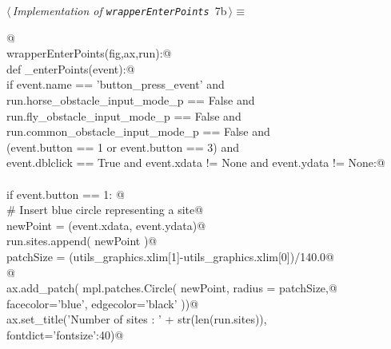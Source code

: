 \documentclass[11.5pt]{report}
\begin{document}
\begin{flushleft} \small\label{scrap7}\raggedright\small
{} $\langle\,${\itshape Implementation of \verb|wrapperEnterPoints|}\nobreak\ {\footnotesize {7b}}$\,\rangle\equiv$
\vspace{-1ex}
\begin{list}{}{} \item
\mbox{}\verb@   @\\
\mbox{}\verb@def wrapperEnterPoints(fig,ax,run):@\\
\mbox{}\verb@    def _enterPoints(event):@\\
\mbox{}\verb@        if event.name      == 'button_press_event'          and \@\\
\mbox{}\verb@           run.horse_obstacle_input_mode_p  == False        and \@\\
\mbox{}\verb@           run.fly_obstacle_input_mode_p    == False        and \@\\
\mbox{}\verb@           run.common_obstacle_input_mode_p == False        and \@\\
\mbox{}\verb@           (event.button   == 1 or event.button == 3)       and \@\\
\mbox{}\verb@            event.dblclick == True and event.xdata  != None and event.ydata  != None:@\\
\mbox{}\verb@@\\
\mbox{}\verb@             if event.button == 1:  @\\
\mbox{}\verb@                 # Insert blue circle representing a site@\\
\mbox{}\verb@                 newPoint = (event.xdata, event.ydata)@\\
\mbox{}\verb@                 run.sites.append( newPoint  )@\\
\mbox{}\verb@                 patchSize  = (utils_graphics.xlim[1]-utils_graphics.xlim[0])/140.0@\\
\mbox{}\verb@                    @\\
\mbox{}\verb@                 ax.add_patch( mpl.patches.Circle( newPoint, radius = patchSize,@\\
\mbox{}\verb@                                                   facecolor='blue', edgecolor='black'  ))@\\
\mbox{}\verb@                 ax.set_title('Number of sites : ' + str(len(run.sites)), \@\\
\mbox{}\verb@                              fontdict={'fontsize':40})@\\

\end{list}
\end{flushleft}
\end{document}
